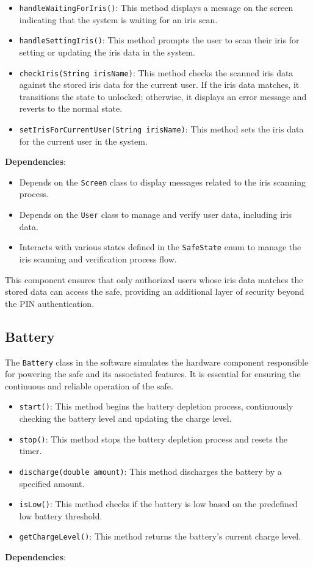 \documentclass{article}
\begin{document}
\begin{itemize}
    \item \texttt{handleWaitingForIris()}: This method displays a message on the screen indicating that the system is waiting for an iris scan.
    \item \texttt{handleSettingIris()}: This method prompts the user to scan their iris for setting or updating the iris data in the system.
    \item \texttt{checkIris(String irisName)}: This method checks the scanned iris data against the stored iris data for the current user. If the iris data matches, it transitions the state to unlocked; otherwise, it displays an error message and reverts to the normal state.
    \item \texttt{setIrisForCurrentUser(String irisName)}: This method sets the iris data for the current user in the system.
\end{itemize}
\textbf{Dependencies}:
\begin{itemize}
    \item Depends on the \texttt{Screen} class to display messages related to the iris scanning process.
    \item Depends on the \texttt{User} class to manage and verify user data, including iris data.
    \item Interacts with various states defined in the \texttt{SafeState} enum to manage the iris scanning and verification process flow.
\end{itemize}
This component ensures that only authorized users whose iris data matches the stored data can access the safe, providing an additional layer of security beyond the PIN authentication.

\subsection{Battery}

The \texttt{Battery} class in the software simulates the hardware component responsible for powering the safe and its associated features. It is essential for ensuring the continuous and reliable operation of the safe.

\begin{itemize}
    \item \texttt{start()}: This method begins the battery depletion process, continuously checking the battery level and updating the charge level.
    \item \texttt{stop()}: This method stops the battery depletion process and resets the timer.
    \item \texttt{discharge(double amount)}: This method discharges the battery by a specified amount.
    \item \texttt{isLow()}: This method checks if the battery is low based on the predefined low battery threshold.
    \item \texttt{getChargeLevel()}: This method returns the battery's current charge level.
\end{itemize}
\textbf{Dependencies}:
\end{document}
